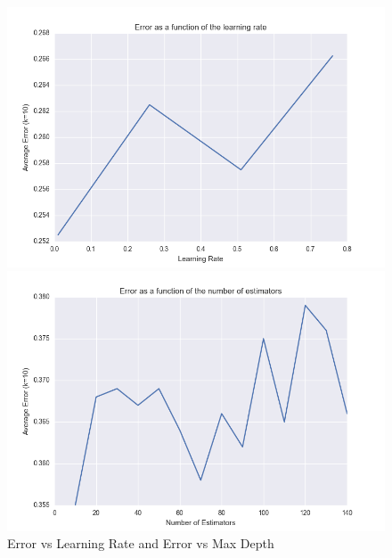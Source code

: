 \documentclass{article} %
\begin{document}
\begin{figure}[!ht]
\begin{center}
\caption{Error vs Learning Rate and Error vs Max Depth}
\begin{minipage}[b]{0.40\linewidth}
	\includegraphics[scale=0.30]{ErrorVsLearningRate-AdaBoostRandomForest.png}
\end{minipage}
\quad
\begin{minipage}[b]{0.40\linewidth}
	\includegraphics[scale=0.30]{AdaBoostErrorvsEstimators.png}
\end{minipage}
\end{center}
\end{figure}
\end{document}
